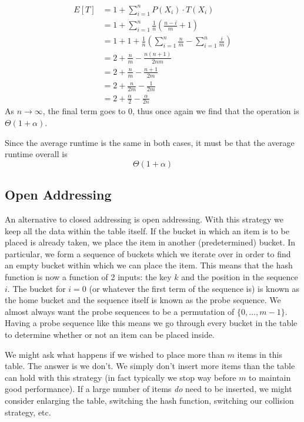 \begin{align*}
    E[T] &= 1 + \sum_{i = 1}^{n} P(X_i) \cdot T(X_i)\\
    &= 1 + \sum_{i = 1}^{n} \frac{1}{n} \left(\frac{n - i}{m} + 1\right)\\
    &= 1 + 1 + \frac{1}{n} \left( \sum_{i = 1}^{n} \frac{n}{m} - \sum_{i = 1}^{n} \frac{i}{m} \right)\\
    &= 2 + \frac{n}{m} - \frac{n(n+1)}{2nm}\\
    &= 2 + \frac{n}{m} - \frac{n + 1}{2m}\\
    &= 2 + \frac{n}{2m} - \frac{1}{2m}\\
    &= 2 + \frac{\alpha}{2} - \frac{\alpha}{2n}
\end{align*}
As $n \to \infty$, the final term goes to 0, thus once again we find that the operation is $\Theta(1 + \alpha)$. 

Since the average runtime is the same in both cases, it must be that the average runtime overall is 
$$\Theta(1 + \alpha)$$

\subsection{Open Addressing}
An alternative to closed addressing is open addressing. With this strategy we keep all the data within the table itself. If the bucket in which an item is to be placed is already taken, we place the item in another (predetermined) bucket. In particular, we form a sequence of buckets which we iterate over in order to find an empty bucket within which we can place the item. This means that the hash function is now a function of 2 inputs: the key $k$ and the position in the sequence $i$. The bucket for $i = 0$ (or whatever the first term of the sequence is) is known as the home bucket and the sequence itself is known as the probe sequence. We almost always want the probe sequences to be a permutation of $\{0, \dots, m - 1\}$. Having a probe sequence like this means we go through every bucket in the table to determine whether or not an item can be placed inside. 

\begin{remark}
We might ask what happens if we wished to place more than $m$ items in this table. The answer is we don't. We simply don't insert more items than the table can hold with this strategy (in fact typically we stop way before $m$ to maintain good performance). If a large number of items \textit{do} need to be inserted, we might consider enlarging the table, switching the hash function, switching our collision strategy, etc.
\end{remark}

